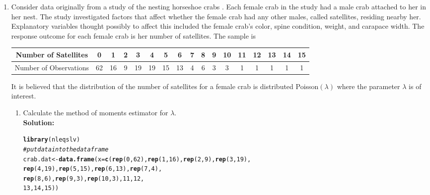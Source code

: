 \documentclass{article}\usepackage[]{graphicx}\usepackage[]{color}
\makeatletter
\newcommand{\hlnum}[1]{\textcolor[rgb]{0.686,0.059,0.569}{#1}}%
\newcommand{\hlcom}[1]{\textcolor[rgb]{0.678,0.584,0.686}{\textit{#1}}}%
\newcommand{\hlstd}[1]{\textcolor[rgb]{0.345,0.345,0.345}{#1}}%
\newcommand{\hlkwb}[1]{\textcolor[rgb]{0.69,0.353,0.396}{#1}}%
\newcommand{\hlkwc}[1]{\textcolor[rgb]{0.333,0.667,0.333}{#1}}%
\newcommand{\hlkwd}[1]{\textcolor[rgb]{0.737,0.353,0.396}{\textbf{#1}}}%
\newenvironment{kframe}{%
 \def\at@end@of@kframe{}%
 \ifinner\ifhmode%
  \def\at@end@of@kframe{\end{minipage}}%
  \begin{minipage}{\columnwidth}%
 \fi\fi%
 \def\FrameCommand##1{\hskip\@totalleftmargin \hskip-\fboxsep
 \colorbox{shadecolor}{##1}\hskip-\fboxsep
     \hskip-\linewidth \hskip-\@totalleftmargin \hskip\columnwidth}%
 \MakeFramed {\advance\hsize-\width
   \@totalleftmargin\z@ \linewidth\hsize
   \@setminipage}}%
 {\par\unskip\endMakeFramed%
 \at@end@of@kframe}
\newenvironment{knitrout}{}{} %
\makeatother
\begin{document}
\begin{enumerate}
\item Consider  data originally from a study of the nesting horseshoe crabs 
\citep{Brockmann96}. Each female crab in the study had a male crab attached to 
her in her nest. The study investigated factors that affect whether the female 
crab had any other males, called satellites, residing nearby her. Explanatory 
variables thought possibly to affect this included the female crab's color, 
spine condition, weight, and carapace width. The response outcome for each 
female crab is her number of satellites.
	 The sample is
	\begin{center}
		\begin{tabular}{|ccccccccccccccccc|}\hline
		 Number of Satellites& 0 & 1&  2&  3&  4&  5&  6&  7&  8&  9& 10& 11& 12& 13 &14& 15\\ \hline
		 Number of Observations&62& 16&  9& 19& 19& 15& 13&  4&  6&  3&  3&  1&  1&  1&  1&1\\\hline
 		\end{tabular}
	\end{center}
 	It is believed that the distribution of the number of satellites for a female 
 	crab is distributed Poisson$(\lambda)$ where the parameter $\lambda$ is of interest.
	\begin{enumerate}
	\item Calculate the method of moments estimator for $\lambda$.\\
	\textbf{Solution:}
\begin{knitrout}
\color{fgcolor}\begin{kframe}
\begin{alltt}
\hlkwd{library}\hlstd{(nleqslv)}
\hlcom{#put data into the dataframe}
\hlstd{crab.dat} \hlkwb{<-} \hlkwd{data.frame}\hlstd{(}\hlkwc{x}\hlstd{=}\hlkwd{c}\hlstd{(}\hlkwd{rep}\hlstd{(}\hlnum{0}\hlstd{,}\hlnum{62}\hlstd{),} \hlkwd{rep}\hlstd{(}\hlnum{1}\hlstd{,} \hlnum{16}\hlstd{),} \hlkwd{rep}\hlstd{(}\hlnum{2}\hlstd{,} \hlnum{9}\hlstd{),} \hlkwd{rep}\hlstd{(}\hlnum{3}\hlstd{,} \hlnum{19}\hlstd{),}
                           \hlkwd{rep}\hlstd{(}\hlnum{4}\hlstd{,} \hlnum{19}\hlstd{),} \hlkwd{rep}\hlstd{(}\hlnum{5}\hlstd{,} \hlnum{15}\hlstd{),} \hlkwd{rep}\hlstd{(}\hlnum{6}\hlstd{,} \hlnum{13}\hlstd{),} \hlkwd{rep}\hlstd{(}\hlnum{7}\hlstd{,} \hlnum{4}\hlstd{),}
                           \hlkwd{rep}\hlstd{(}\hlnum{8}\hlstd{,} \hlnum{6}\hlstd{),} \hlkwd{rep}\hlstd{(}\hlnum{9}\hlstd{,} \hlnum{3}\hlstd{),} \hlkwd{rep}\hlstd{(}\hlnum{10}\hlstd{,} \hlnum{3}\hlstd{),} \hlnum{11}\hlstd{,} \hlnum{12}\hlstd{,}
                           \hlnum{13}\hlstd{,} \hlnum{14}\hlstd{,} \hlnum{15}\hlstd{))}




\end{alltt}
\end{kframe}
\end{knitrout}
\end{enumerate}
\end{enumerate}
\end{document}
